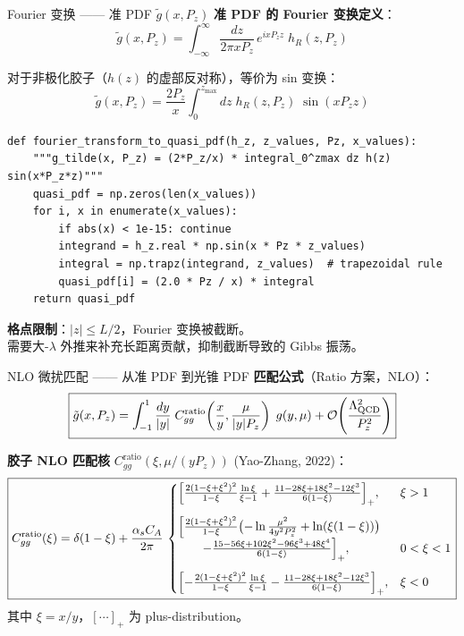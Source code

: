 \documentclass[10pt,aspectratio=169]{beamer}
\newcommand{\lqcd}{\Lambda_{\mathrm{QCD}}}
\newcommand{\alphas}{\alpha_s}
\newcommand{\Pz}{P_z}
\newcommand{\CA}{C_A}
\begin{document}
\begin{frame}[fragile]{Fourier 变换 —— 准 PDF $\tilde{g}(x, \Pz)$}
\small
\textbf{准 PDF 的 Fourier 变换定义}：
\begin{equation}
  \boxed{
  \tilde{g}(x, \Pz) = \int_{-\infty}^{\infty} \frac{dz}{2\pi x \Pz}\,
  e^{i x \Pz z}\; h_R(z, \Pz)
  }
\end{equation}

对于非极化胶子（$h(z)$ 的虚部反对称），等价为 sin 变换：
\begin{equation}
  \boxed{
  \tilde{g}(x, \Pz) = \frac{2\Pz}{x}
  \int_0^{z_{\max}} dz\; h_R(z, \Pz)\;\sin(x \Pz z)
  }
\end{equation}

\begin{lstlisting}
def fourier_transform_to_quasi_pdf(h_z, z_values, Pz, x_values):
    """g_tilde(x, P_z) = (2*P_z/x) * integral_0^zmax dz h(z) sin(x*P_z*z)"""
    quasi_pdf = np.zeros(len(x_values))
    for i, x in enumerate(x_values):
        if abs(x) < 1e-15: continue
        integrand = h_z.real * np.sin(x * Pz * z_values)
        integral = np.trapz(integrand, z_values)  # trapezoidal rule
        quasi_pdf[i] = (2.0 * Pz / x) * integral
    return quasi_pdf
\end{lstlisting}

\textbf{格点限制}：$|z| \le L/2$，Fourier 变换被截断。\\
需要大-$\lambda$ 外推来补充长距离贡献，抑制截断导致的 Gibbs 振荡。
\end{frame}

\begin{frame}{NLO 微扰匹配 —— 从准 PDF 到光锥 PDF}
\small
\textbf{匹配公式}（Ratio 方案，NLO）：
\begin{equation}
  \boxed{
  \tilde{g}(x, \Pz) = \int_{-1}^{1} \frac{dy}{|y|}\;
  C^{\text{ratio}}_{gg}\!\left(\frac{x}{y}, \frac{\mu}{|y|\Pz}\right)\;
  g(y, \mu) + \order{\frac{\lqcd^2}{\Pz^2}}
  }
\end{equation}

\textbf{胶子 NLO 匹配核} $C^{\text{ratio}}_{gg}(\xi, \mu/(y\Pz))$ (Yao-Zhang, 2022)：
\begin{equation}
  \boxed{
  C^{\text{ratio}}_{gg}(\xi) = \delta(1-\xi) + \frac{\alphas\CA}{2\pi}\,
  \begin{cases}
    \Bigl[\frac{2(1-\xi+\xi^2)^2}{1-\xi}\frac{\ln\xi}{\xi-1}
    + \frac{11-28\xi+18\xi^2-12\xi^3}{6(1-\xi)}\Bigr]_+, & \xi > 1 \\[12pt]
    \Bigl[\frac{2(1-\xi+\xi^2)^2}{1-\xi}
    \bigl(-\ln\frac{\mu^2}{4y^2\Pz^2} + \ln(\xi(1-\xi))\bigr) \\
    \qquad - \frac{15-56\xi+102\xi^2-96\xi^3+48\xi^4}{6(1-\xi)}\Bigr]_+, & 0<\xi<1 \\[12pt]
    \Bigl[-\frac{2(1-\xi+\xi^2)^2}{1-\xi}\frac{\ln\xi}{\xi-1}
    - \frac{11-28\xi+18\xi^2-12\xi^3}{6(1-\xi)}\Bigr]_+, & \xi < 0
  \end{cases}
  }
\end{equation}
其中 $\xi = x/y$，$[\cdots]_+$ 为 plus-distribution。
\end{frame}
\end{document}
